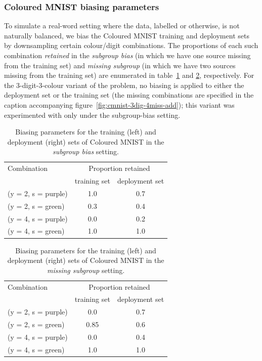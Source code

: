 \subsubsection{Coloured MNIST biasing parameters}
To simulate a real-word setting where the data, labelled or otherwise, is not naturally balanced, we bias the Coloured MNIST training and deployment sets by downsampling certain colour/digit combinations. The proportions of each such combination \emph{retained} in the \emph{subgroup bias} (in which we have one source missing from the training set) and \emph{missing subgroup} (in which we have two sources missing from the training set) are enumerated in table~\ref{color_mnist_biasing_po} and \ref{color_mnist_biasing_id}, respectively.
For the 3-digit-3-colour variant of the problem, no biasing is applied to either the deployment set or the training set (the missing combinations are specified in the caption accompanying figure~\ref{fig:cmnist-3dig-4miss-add}); this variant was experimented with only under the subgroup-bias setting.

\begin{table}[ht]
\caption{Biasing parameters for the training (left) and deployment (right) sets of Coloured MNIST in the \emph{subgroup bias} setting.}
\label{color_mnist_biasing_po}
\centering
\begin{tabular}{lcc}
\toprule
Combination   & \multicolumn{2}{c}{Proportion retained} \\ \cmidrule(lr){2-3}
  & training set & deployment set \\ \midrule
(y = 2, s = {\color{purple}purple}) & 1.0  & 0.7 \\
(y = 2, s = {\color{green}green})   & 0.3  & 0.4 \\
(y = 4, s = {\color{purple}purple}) & 0.0  & 0.2 \\
(y = 4, s = {\color{green}green})   & 1.0  & 1.0 \\
\bottomrule
\end{tabular}
\end{table}

\begin{table}[ht]
\caption{Biasing parameters for the training (left) and deployment (right) sets of Coloured MNIST in the \emph{missing subgroup} setting.}
\label{color_mnist_biasing_id}
\centering
\begin{tabular}{lcc}
\toprule
Combination   & \multicolumn{2}{c}{Proportion retained} \\ \cmidrule(lr){2-3}
  & training set & deployment set \\ \midrule
(y = 2, s = {\color{purple}purple}) & 0.0  & 0.7 \\
(y = 2, s = {\color{green}green})   & 0.85 & 0.6 \\
(y = 4, s = {\color{purple}purple}) & 0.0  & 0.4 \\
(y = 4, s = {\color{green}green})   & 1.0  & 1.0 \\
\bottomrule
\end{tabular}
\end{table}

